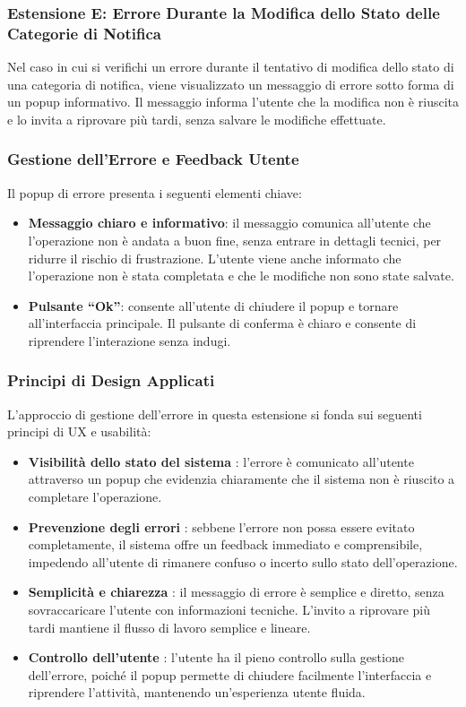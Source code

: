 \clearpage
\newpage

\subsubsection{Estensione E: Errore Durante la Modifica dello Stato delle Categorie di Notifica}

Nel caso in cui si verifichi un errore durante il tentativo di modifica dello stato di una categoria di notifica, viene visualizzato un messaggio di errore sotto forma di un popup informativo. Il messaggio informa l'utente che la modifica non è riuscita e lo invita a riprovare più tardi, senza salvare le modifiche effettuate.

\vspace{0.5cm}
\subsubsection{Gestione dell'Errore e Feedback Utente} Il popup di errore presenta i seguenti elementi chiave: \begin{itemize} \item \textbf{Messaggio chiaro e informativo}: il messaggio comunica all'utente che l'operazione non è andata a buon fine, senza entrare in dettagli tecnici, per ridurre il rischio di frustrazione. L'utente viene anche informato che l'operazione non è stata completata e che le modifiche non sono state salvate. \item \textbf{Pulsante “Ok”}: consente all'utente di chiudere il popup e tornare all'interfaccia principale. Il pulsante di conferma è chiaro e consente di riprendere l'interazione senza indugi. \end{itemize}

\subsubsection{Principi di Design Applicati} L'approccio di gestione dell'errore in questa estensione si fonda sui seguenti principi di UX e usabilità: \begin{itemize} \item \textbf{Visibilità dello stato del sistema} \cite{nielsen1995}: l'errore è comunicato all'utente attraverso un popup che evidenzia chiaramente che il sistema non è riuscito a completare l'operazione. \item \textbf{Prevenzione degli errori} \cite{nielsen1995}: sebbene l'errore non possa essere evitato completamente, il sistema offre un feedback immediato e comprensibile, impedendo all'utente di rimanere confuso o incerto sullo stato dell'operazione. \item \textbf{Semplicità e chiarezza} \cite{nielsen1995}: il messaggio di errore è semplice e diretto, senza sovraccaricare l'utente con informazioni tecniche. L'invito a riprovare più tardi mantiene il flusso di lavoro semplice e lineare. \item \textbf{Controllo dell'utente} \cite{norman1988}: l'utente ha il pieno controllo sulla gestione dell'errore, poiché il popup permette di chiudere facilmente l'interfaccia e riprendere l'attività, mantenendo un'esperienza utente fluida. \end{itemize}

